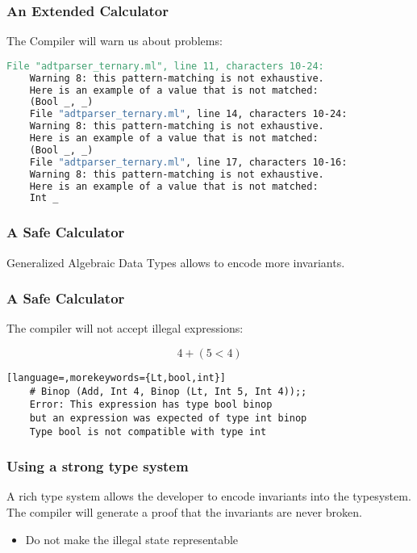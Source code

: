 \documentclass[xcolor=svgnames]{beamer}
\renewcommand{\_}{\mathunderscore}
\begin{document}
\begin{frame}[fragile]
  \frametitle{An Extended Calculator}
  The Compiler will warn us about problems:
  \begin{lstlisting}[basicstyle={\footnotesize\ttfamily},language=make]
    File "adtparser_ternary.ml", line 11, characters 10-24:
    Warning 8: this pattern-matching is not exhaustive.
    Here is an example of a value that is not matched:
    (Bool _, _)
    File "adtparser_ternary.ml", line 14, characters 10-24:
    Warning 8: this pattern-matching is not exhaustive.
    Here is an example of a value that is not matched:
    (Bool _, _)
    File "adtparser_ternary.ml", line 17, characters 10-16:
    Warning 8: this pattern-matching is not exhaustive.
    Here is an example of a value that is not matched:
    Int _
  \end{lstlisting}

\end{frame}

\begin{frame}[fragile]
  \frametitle{A Safe Calculator}
  Generalized Algebraic Data Types allows to encode more invariants.

  
\end{frame}

\begin{frame}[fragile]
  \frametitle{A Safe Calculator}
  The compiler will not accept illegal expressions:

  \[4 + (5 < 4)\]

  \begin{lstlisting}[language=,morekeywords={Lt,bool,int}]
    # Binop (Add, Int 4, Binop (Lt, Int 5, Int 4));;
    Error: This expression has type bool binop
    but an expression was expected of type int binop
    Type bool is not compatible with type int
  \end{lstlisting}

\end{frame}

\begin{frame}[fragile]
  \frametitle{Using a strong type system}
  A rich type system allows the developer to encode invariants into the typesystem. \\
  The compiler will generate a proof that the invariants are never broken.\\
  \pause

  \begin{itemize}
    \item \LARGE Do not make the illegal state representable
  \end{itemize}
\end{frame}
\end{document}
